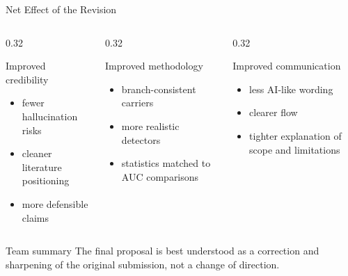 \documentclass[aspectratio=169,11pt]{beamer}
\begin{document}
\begin{frame}{Net Effect of the Revision}
\footnotesize
\begin{columns}[T]
\begin{column}{0.32\textwidth}
\begin{block}{Improved credibility}
\begin{itemize}
\item fewer hallucination risks
\item cleaner literature positioning
\item more defensible claims
\end{itemize}
\end{block}
\end{column}
\begin{column}{0.32\textwidth}
\begin{block}{Improved methodology}
\begin{itemize}
\item branch-consistent carriers
\item more realistic detectors
\item statistics matched to AUC comparisons
\end{itemize}
\end{block}
\end{column}
\begin{column}{0.32\textwidth}
\begin{block}{Improved communication}
\begin{itemize}
\item less AI-like wording
\item clearer flow
\item tighter explanation of scope and limitations
\end{itemize}
\end{block}
\end{column}
\end{columns}

\vspace{0.08cm}
\begin{alertblock}{Team summary}
The final proposal is best understood as a correction and sharpening of the original submission, not a change of direction.
\end{alertblock}
\end{frame}
\end{document}
